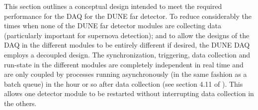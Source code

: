 This section outlines a conceptual design intended to meet the
required performance for the DAQ for the DUNE far detector.  To reduce
considerably the times when none of the DUNE far detector modules are collecting
data (particularly important for supernova detection); and to allow
the designs of the DAQ in the different  modules to be entirely
different if desired, the DUNE DAQ employs a decoupled design.
The synchronization, triggering, data collection and run-state in the
different  modules are completely independent in real time and
are only coupled by processes running asynchronously (in the same fashion
as a batch queue) in the hour or so after data collection (see section
4.11 of \anxlbnefd).  This allows one %
detector module to be restarted without interrupting data collection in the
others. %

